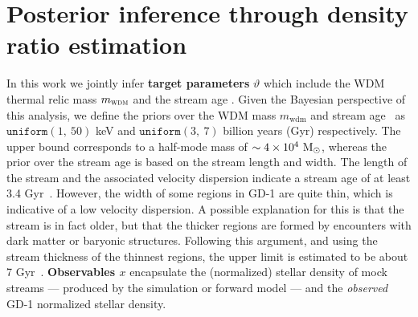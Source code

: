 \documentclass{article}
\begin{document}
\section{Posterior inference through density ratio estimation}
\label{sec:method}
In this work we jointly infer {\bf target parameters} $\vartheta$ which include the WDM
thermal relic mass $m_\textsc{wdm}$ and the stream age \tage.
Given the Bayesian perspective of this analysis, we define the priors over the WDM mass $m_\text{wdm}$ and stream age \tage~as
$\texttt{uniform}(1,~50)$ keV and $\texttt{uniform}(3,~7)$ billion years (Gyr) respectively.
The upper bound corresponds to a half-mode mass of $\sim 4 \times 10^4~\textrm{M}_\odot$,
whereas the prior over the stream age is based on the stream length and width.  The length
of the stream and the associated velocity dispersion indicate a stream age of at least 3.4 Gyr~\citep{webb2019searching}.
However, the width of some regions in GD-1 are quite thin, which is
indicative of a low velocity dispersion. A possible explanation for this is that
the stream is in fact older, but that the thicker regions are formed by encounters
with dark matter or baryonic structures. Following this argument, and using the
stream thickness of the thinnest regions, the upper limit is
estimated to be about 7 Gyr~\citep{banik2019novel}.
{\bf Observables $x$} encapsulate the (normalized) stellar density of mock streams --- produced by the
simulation or forward model --- and the \emph{observed} GD-1 normalized stellar density.
\end{document}
